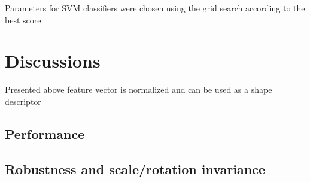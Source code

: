 \documentclass[12pt]{article}
\begin{document}
Parameters for SVM classifiers were chosen using the grid search according to the best score.

\section{Discussions}
Presented above feature vector is normalized and can be used as a shape descriptor  

\subsection{Performance}
\subsection{Robustness and scale/rotation invariance}



\end{document}
